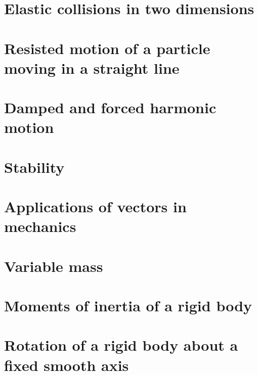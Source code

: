 \documentclass[a4paper]{article}
\begin{document}
\section{Elastic collisions in two dimensions}

\section{Resisted motion of a particle moving in a straight line}

\section{Damped and forced harmonic motion}

\section{Stability}

\section{Applications of vectors in mechanics}

\section{Variable mass}

\section{Moments of inertia of a rigid body}

\section{Rotation of a rigid body about a fixed smooth axis}




\printindex
\end{document}
